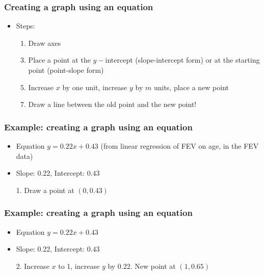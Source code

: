 \documentclass[11pt, hyperref={colorlinks, urlcolor=blue}]{beamer}
\newcommand{\myframe}[1]{\begin{frame} \frametitle{#1}}
\begin{document}
\myframe{Creating a graph using an equation}
\begin{itemize}
\item Steps:
\begin{enumerate}
\item Draw axes
\item[]
\item Place a point at the $y-$intercept (slope-intercept form) or at the starting point (point-slope form)
\item[]
\item Increase $x$ by one unit, increase $y$ by $m$ units, place a new point
\item[]
\item Draw a line between the old point and the new point!
\end{enumerate}
\end{itemize}
\end{frame}

\myframe{Example: creating a graph using an equation}
\centering
\begin{itemize}
\item Equation $y = 0.22x + 0.43$ (from linear regression of FEV on age, in the FEV data)
\item[]
\item Slope: 0.22, Intercept: $0.43$
\item[]
\item[1.] Draw a point at $(0, 0.43)$
\end{itemize}
\end{frame}

\myframe{Example: creating a graph using an equation}
\centering
\begin{itemize}
\item Equation $y = 0.22x + 0.43$
\item[]
\item Slope: 0.22, Intercept: $0.43$
\item[]
\item[2.] Increase $x$ to 1, increase $y$ by 0.22. New point at $(1, 0.65)$
\end{itemize}
\end{frame}
\end{document}
